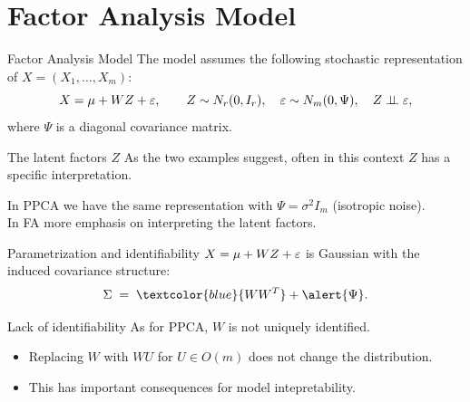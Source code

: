 \documentclass[11pt,handout,aspectratio=169]{beamer}
\begin{document}
\section{Factor Analysis Model}

\begin{frame}{Factor Analysis Model}
The model assumes the following stochastic representation of $X=(X_1,\ldots,X_m)$:
\[ X = \mu + WZ + \varepsilon, \qquad Z\sim N_r(0, I_r),\quad \varepsilon \sim N_m(0, \Psi), \quad Z\perp\!\!\! \perp \varepsilon,\]
where $\Psi$ is a diagonal covariance matrix.
        \begin{block}{The latent factors $Z$}
        	As the two examples suggest, often in this context $Z$ has a specific interpretation.
        \end{block}
      \bigskip     
In PPCA we have the same representation with $\Psi=\sigma^2 I_m$ (isotropic noise).\\[4mm]

In FA more emphasis on interpreting the latent factors.
\end{frame}

\begin{frame}{Parametrization and identifiability}
	$X=\mu+WZ+\varepsilon$ is Gaussian with the induced covariance structure: \[ \Sigma \;=\; \textcolor{blue}{WW^T} + \alert{\Psi}. \]
\begin{alertblock}{Lack of identifiability}
	As for PPCA, $W$ is not uniquely identified.
	\begin{itemize}
		\item Replacing $W$ with $WU$ for $U\in O(m)$ does not change the distribution.
		\item This has important consequences for model intepretability.
	\end{itemize}
\end{alertblock}
\end{frame}
\end{document}
